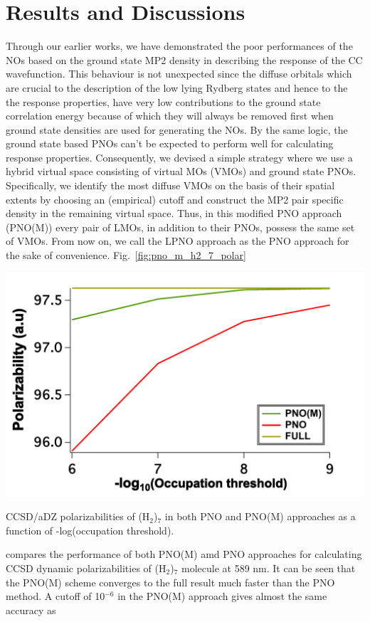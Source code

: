 \section{Results and Discussions}
Through our earlier works\cite{Kumar17,Kumar18:1}, we have demonstrated the poor performances of 
the NOs based on the ground state MP2 density in describing the response 
of the CC wavefunction. This behaviour is not unexpected since the diffuse orbitals
which are crucial to the description of the low lying Rydberg states and hence to the  
the response properties, have very low contributions to the ground state correlation energy
because of which they will always be removed first when ground state densities are used
for generating the NOs. By the same logic, the ground state based PNOs can't be expected to 
perform well for calculating response properties. Consequently, we devised a simple strategy 
where we use a hybrid virtual space consisting of virtual MOs (VMOs) and ground state PNOs. 
Specifically, we identify the most diffuse VMOs on the basis of their spatial extents\cite{Kumar18:1} 
by choosing an (empirical) cutoff and construct the MP2 pair specific density in the remaining  
virtual space. Thus, in this modified PNO approach (PNO(M)) every pair of LMOs, in addition to 
their PNOs, possess the same set of VMOs. From now on, we call the LPNO approach as the PNO 
approach for the sake of convenience.
Fig.~\ref{fig:pno_m_h2_7_polar}
\begin{MyFigure}[h!]
\centering
\includegraphics[width=0.6\linewidth,natwidth=610,natheight=642]{figures_pno++/pno_m_h2_7_adz_polar.pdf}
\caption{{\footnotesize CCSD/aDZ polarizabilities of (H$_2$)$_7$ in both PNO and PNO(M) approaches 
as a function of -log(occupation threshold).}}
\label{fig:pno_m_h2_7_polar}
\end{MyFigure}
compares the performance of both PNO(M) amd PNO approaches for calculating CCSD dynamic polarizabilities of
(H$_2$)$_7$ molecule at 589 nm. It can be seen that the PNO(M) scheme converges to the full result much 
faster than the PNO method. A cutoff of 10$^{-6}$ in the PNO(M) approach gives almost the same accuracy as 
